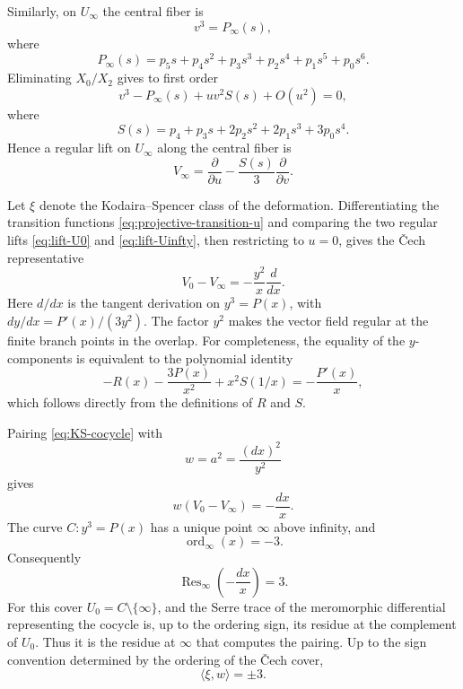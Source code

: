 \documentclass[10pt,a4paper]{amsart}
\begin{document}
Similarly, on $U_\infty$ the central fiber is
\begin{equation*}
v^3=P_\infty(s),
\end{equation*}
where
\begin{equation*}
P_\infty(s)
=
p_5s+p_4s^2+p_3s^3+p_2s^4+p_1s^5+p_0s^6.
\end{equation*}
Eliminating $X_0/X_2$ gives to first order
\begin{equation*}
v^3-P_\infty(s)+uv^2S(s)+O(u^2)=0,
\end{equation*}
where
\begin{equation*}
S(s)
=
p_4+p_3s+2p_2s^2+2p_1s^3+3p_0s^4.
\end{equation*}
Hence a regular lift on $U_\infty$ {along the central fiber} is
\begin{equation}
\label{eq:lift-Uinfty}
V_\infty
=
\frac{\partial}{\partial u}
-\frac{S(s)}{3}\frac{\partial}{\partial v}.
\end{equation}

Let $\xi$ denote the Kodaira--Spencer class of the deformation.
Differentiating the transition functions
\eqref{eq:projective-transition-u} and comparing the two regular
lifts \eqref{eq:lift-U0} and \eqref{eq:lift-Uinfty}, then restricting
to $u=0$, gives the \v{C}ech representative
\begin{equation}
\label{eq:KS-cocycle}
V_0-V_\infty
=
-\frac{y^2}{x}\frac{d}{dx}.
\end{equation}
{Here $d/dx$ is the tangent derivation on $y^3=P(x)$, with
$dy/dx=P'(x)/(3y^2)$. The factor $y^2$ makes the vector field
regular at the finite branch points in the overlap.}
For completeness, the equality of the $y$-components is equivalent
to the polynomial identity
\begin{equation*}
-R(x)-\frac{3P(x)}{x^2}
+x^2S(1/x)
=
-\frac{P'(x)}{x},
\end{equation*}
which follows directly from the definitions of $R$ and $S$.

Pairing \eqref{eq:KS-cocycle} with
\begin{equation*}
w=a^2=\frac{(dx)^2}{y^2}
\end{equation*}
gives
\begin{equation}
\label{eq:serre-meromorphic-differential}
w(V_0-V_\infty)
=
-\frac{dx}{x}.
\end{equation}
The curve $C:y^3=P(x)$ has a unique point $\infty$ above infinity,
and
\begin{equation*}
\operatorname{ord}_\infty(x)=-3.
\end{equation*}
Consequently
\begin{equation*}
\operatorname{Res}_\infty\left(-\frac{dx}{x}\right)=3.
\end{equation*}
{For this cover $U_0=C\setminus\{\infty\}$, and the Serre trace
of the meromorphic differential representing the cocycle is, up to
the ordering sign, its residue at the complement of $U_0$.
Thus it is the residue at $\infty$ that computes the pairing.}
Up to the sign convention determined by the ordering of the
\v{C}ech cover,
\begin{equation}
\label{eq:KS-w-pairing}
\langle\xi,w\rangle=\pm3.
\end{equation}
\end{document}
